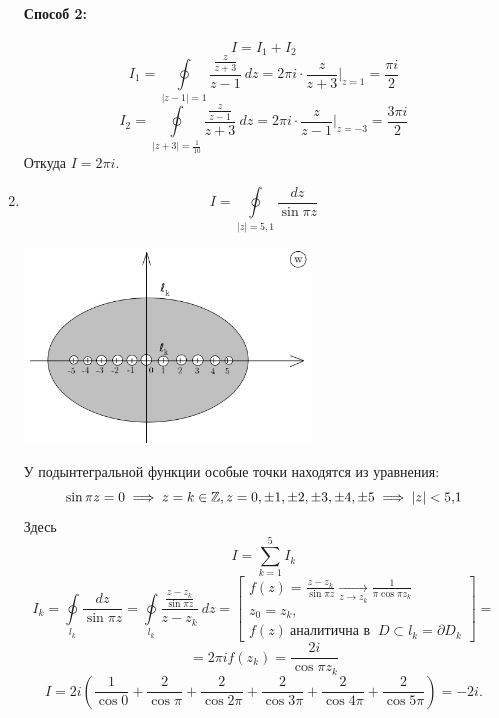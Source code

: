 \documentclass[../../main.tex]{subfiles}
\begin{document}
\begin{examples}
\begin{enumerate}
			\paragraph{Способ 2:}
			\[I = I_1 + I_2\]
			\[ I_1 = \oint \limits_{|z-1| = 1} 
			\frac{\frac{z}{z+3}}{z-1} \ dz = 2 \pi i \cdot \frac{z}{z+3} \bigg|_{z=1} = 
			\frac{\pi i}{2} \]
			\[ I_2 = \oint \limits_{|z+3| = \frac{1}{10}} \frac{\frac{z}{z-1}}{z+3} \ 
			dz = 2 \pi i \cdot \frac{z}{z-1} \bigg|_{z=-3} = \frac{3 \pi i}{2}  
			 \]
			 Откуда
			$ I = 2 \pi i. $
	\item \[ I = \oint \limits_{|z|=5,1} \frac{dz}{\sin{\pi z}} \]
	\begin{center}
		\includegraphics[width=0.6\textwidth]{lec32_4}
	\end{center}
	У подынтегральной функции особые точки находятся из уравнения:
	\[  \sin{\pi z} = 0 \implies z = k \in \mathbb{Z}, z = 0, \pm 1, \pm 2, \pm 3 , \pm 4 
	, \pm 5 \implies |z| < 5,\!1     \]
	Здесь 
	\[  I = \sum_{k=1}^{5} I_k       \]
	\[  I_k = \oint \limits_{l_k} \frac{dz}{\sin{\pi z}} = \oint \limits_{l_k} 
	\frac{\frac{z-z_k}{\sin{\pi z}}}{z-z_k} \ dz = \left[ \begin{gathered} f(z) = 
	\frac{z-z_k}{\sin{\pi z}} \underset{z \to z_k}{\rightarrow} \frac{1}{\pi 
	\cos{\pi z_k}} \\
	z_0 = z_k,\\ f(z) \ \text{аналитична в } \ D \subset l_k = \partial D_k 
	\end{gathered} \right] =          \]
	\[  = 2 \pi i f(z_k) = \frac{2i}{\cos{\pi z_k}}       \]
	\[   I = 2i \left( \frac{1}{\cos{0}} + \frac{2}{\cos{\pi}} + \frac{2}{\cos{2 
	\pi}} + \frac{2}{\cos{3 \pi}}  + \frac{2}{\cos{4 \pi}} + \frac{2}{\cos{5 
	\pi}}\right) = -2i.      \]
	\end{enumerate}
\end{examples}
\end{document}
